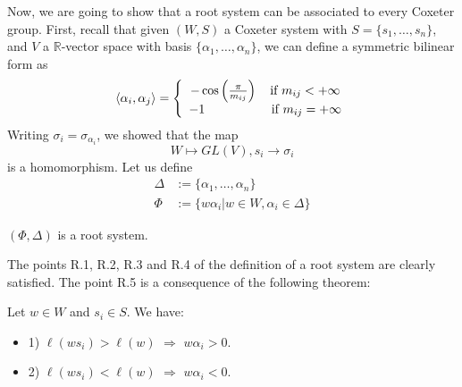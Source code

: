 Now, we are going to show that a root system can be associated to every Coxeter group. First, recall that given $(W, S)$ a Coxeter system with $S = \{s_1, \ldots, s_n \}$, and $V$ a $\mathbb{R}$-vector space with basis $\{\alpha_1, \ldots, \alpha_n \}$, we can define a symmetric bilinear form as
\begin{equation}
\langle \alpha_i , \alpha_j \rangle = \left \{
\begin{array}{c @{} c}
    &- \cos \left(\frac{\pi}{m_{ij}} \right) \quad \text{if } m_{ij} < + \infty \\
    &-1 \quad ~~~~~~~~~~~~~\text{if } m_{ij} = + \infty \\
\end{array}
\right.
\end{equation} 	Writing $\sigma_i = \sigma_{\alpha_i}$, we showed that the map
\begin{equation}
W \mapsto GL(V), s_i \to \sigma_i
\label{correspondance}
\end{equation} is a homomorphism. Let us define
\begin{equation}
\begin{split}
\Delta &:= \{\alpha_1, \ldots, \alpha_n \} \\
\Phi &:= \{w \alpha_i | w \in W , \alpha_i \in \Delta \}
\end{split}
\end{equation}

\begin{theorem}
$(\Phi, \Delta)$ is a root system.
\end{theorem}

The points R.1, R.2, R.3 and R.4 of the definition of a root system are clearly satisfied. The point R.5 is a consequence of the following theorem:

\begin{theorem}
Let $w \in W$ and $s_i \in S$. We have:
\begin{itemize}
\item 1) $\ell (w s_i) > \ell(w)$ $\Rightarrow$ $w \alpha_i > 0$.
\item 2) $\ell (w s_i) < \ell (w)$ $\Rightarrow$ $w \alpha_i < 0$.
\end{itemize}
\label{theorem length}
\end{theorem}

